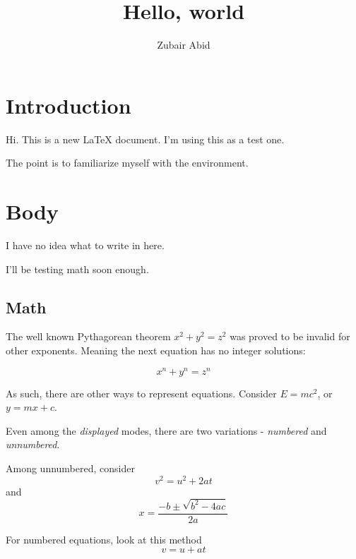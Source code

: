 \documentclass{article}
\title{Hello, world}
\author{Zubair Abid}
\begin{document}
	\maketitle

    \section{Introduction}
	Hi. This is a new \LaTeX{} document. I'm using this as a test one.
	
	The point is to familiarize myself with the environment.    
    
	\section{Body}
	I have no idea what to write in here.
	
	I'll be testing math soon enough.
	
	\subsection{Math}
	The well known Pythagorean theorem \(x^2 + y^2 = z^2\) was proved to be invalid for other exponents. 	
	Meaning the next equation has no integer solutions: 
	
	\[ x^n + y^n = z^n \]   
    
	As such, there are other ways to represent equations. Consider $E = mc^2$, or \begin{math}y = mx + c\end{math}.
	
	Even among the \textit{displayed} modes, there are two variations - \textit{numbered} and \textit{unnumbered}.
	
	Among unnumbered, consider $$v^2 = u^2 + 2at$$ and \[ x = \frac{-b \pm \sqrt{b^2 - 4ac}}{2a} \]    
	
	For numbered equations, look at this method
	\begin{equation}
		v = u + at	
	\end{equation}
		
\end{document}
